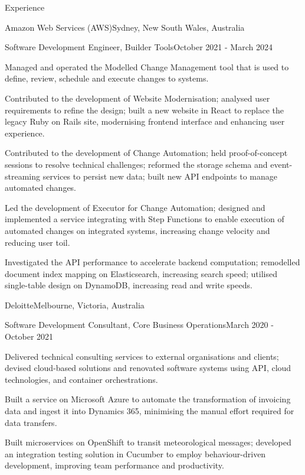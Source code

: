 \documentclass{cv}
\begin{document}
\begin{cvsection}{Experience}
\begin{cvheading}{Amazon Web Services (AWS)}{Sydney, New South Wales, Australia}
\begin{cvsubheading}{Software Development Engineer, Builder Tools}{October 2021 - March 2024}
\item Managed and operated the Modelled Change Management tool that is used to define, review, schedule and execute changes to systems.
\item Contributed to the development of Website Modernisation; analysed user requirements to refine the design; built a new website in React to replace the legacy Ruby on Rails site, modernising frontend interface and enhancing user experience.
\item Contributed to the development of Change Automation; held proof-of-concept sessions to resolve technical challenges; reformed the storage schema and event-streaming services to persist new data; built new API endpoints to manage automated changes.
\item Led the development of Executor for Change Automation; designed and implemented a service integrating with Step Functions to enable execution of automated changes on integrated systems, increasing change velocity and reducing user toil.
\item Investigated the API performance to accelerate backend computation; remodelled document index mapping on Elasticsearch, increasing search speed; utilised single-table design on DynamoDB, increasing read and write speeds.
\end{cvsubheading}
\end{cvheading}

\begin{cvheading}{Deloitte}{Melbourne, Victoria, Australia}
\begin{cvsubheading}{Software Development Consultant, Core Business Operations}{March 2020 - October 2021}
\item Delivered technical consulting services to external organisations and clients; devised cloud-based solutions and renovated software systems using API, cloud technologies, and container orchestrations.
\item Built a service on Microsoft Azure to automate the transformation of invoicing data and ingest it into Dynamics 365, minimising the manual effort required for data transfers.
\item Built microservices on OpenShift to transit meteorological messages; developed an integration testing solution in Cucumber to employ behaviour-driven development, improving team performance and productivity.
\end{cvsubheading}
\end{cvheading}


\end{cvsection}
\end{document}
